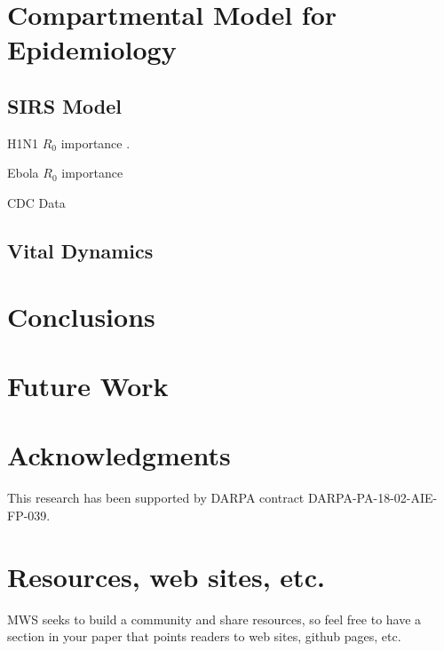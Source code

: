 \documentclass[11pt]{article}
\begin{document}
\section{Compartmental Model for Epidemiology}

\subsection{SIRS Model}

H1N1 $R_0$ importance \cite{fraser2009pandemic}.

Ebola $R_0$ importance \cite{fisman2014early}

CDC Data \cite{cdc2019fluview}

\subsection{Vital Dynamics}

\section{Conclusions}

\section{Future Work}

\section{Acknowledgments}

This research has been supported by DARPA contract DARPA-PA-18-02-AIE-FP-039.

\section{Resources, web sites, etc.}

MWS seeks to build a community and share resources, so feel free to have a section in your paper that points readers to web sites, github pages, etc.



\end{document}
